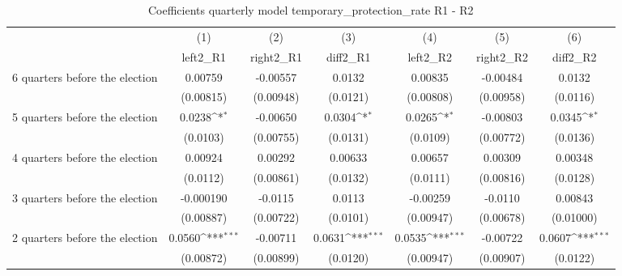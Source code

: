 \begin{table}[!ht]\centering \footnotesize
\def\sym#1{\ifmmode^{#1}\else\(^{#1}\)\fi}
\caption{Coefficients quarterly model temporary\_protection\_rate R1 - R2}
\begin{tabular}{l*{6}{c}}
\hline\hline
                    &\multicolumn{1}{c}{(1)}&\multicolumn{1}{c}{(2)}&\multicolumn{1}{c}{(3)}&\multicolumn{1}{c}{(4)}&\multicolumn{1}{c}{(5)}&\multicolumn{1}{c}{(6)}\\
                    &\multicolumn{1}{c}{left2\_R1}&\multicolumn{1}{c}{right2\_R1}&\multicolumn{1}{c}{diff2\_R1}&\multicolumn{1}{c}{left2\_R2}&\multicolumn{1}{c}{right2\_R2}&\multicolumn{1}{c}{diff2\_R2}\\
\hline
 6 quarters before the election&     0.00759         &    -0.00557         &      0.0132         &     0.00835         &    -0.00484         &      0.0132         \\
                    &   (0.00815)         &   (0.00948)         &    (0.0121)         &   (0.00808)         &   (0.00958)         &    (0.0116)         \\
[1em]
 5 quarters before the election&      0.0238\sym{*}  &    -0.00650         &      0.0304\sym{*}  &      0.0265\sym{*}  &    -0.00803         &      0.0345\sym{*}  \\
                    &    (0.0103)         &   (0.00755)         &    (0.0131)         &    (0.0109)         &   (0.00772)         &    (0.0136)         \\
[1em]
 4 quarters before the election&     0.00924         &     0.00292         &     0.00633         &     0.00657         &     0.00309         &     0.00348         \\
                    &    (0.0112)         &   (0.00861)         &    (0.0132)         &    (0.0111)         &   (0.00816)         &    (0.0128)         \\
[1em]
 3 quarters before the election&   -0.000190         &     -0.0115         &      0.0113         &    -0.00259         &     -0.0110         &     0.00843         \\
                    &   (0.00887)         &   (0.00722)         &    (0.0101)         &   (0.00947)         &   (0.00678)         &   (0.01000)         \\
[1em]
 2 quarters before the election&      0.0560\sym{***}&    -0.00711         &      0.0631\sym{***}&      0.0535\sym{***}&    -0.00722         &      0.0607\sym{***}\\
                    &   (0.00872)         &   (0.00899)         &    (0.0120)         &   (0.00947)         &   (0.00907)         &    (0.0122)         \\

\end{tabular}
\end{table}
